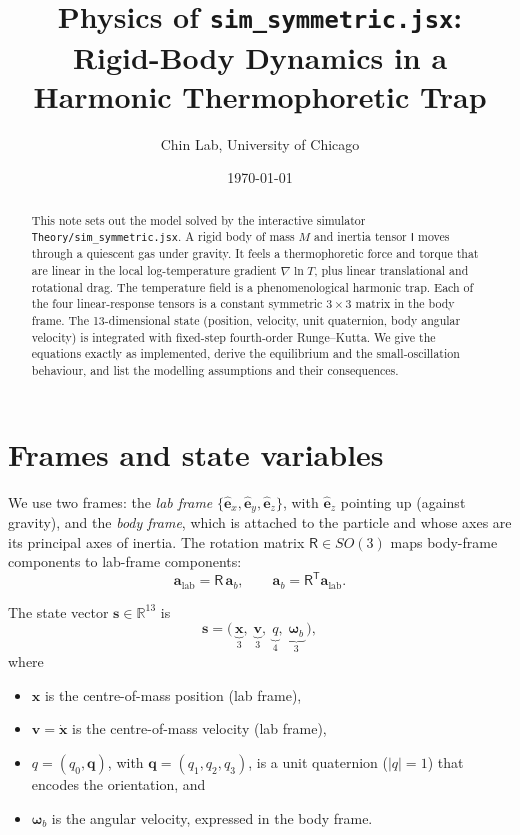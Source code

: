 \documentclass[11pt]{article}
\title{Physics of \texttt{sim\_symmetric.jsx}:\\
Rigid-Body Dynamics in a Harmonic Thermophoretic Trap}
\author{Chin Lab, University of Chicago}
\date{\today}
\newcommand{\vect}[1]{\bm{#1}}
\newcommand{\tens}[1]{\mathsf{#1}}
\newcommand{\ez}{\hat{\vect{e}}_z}
\newcommand{\Rm}{\tens{R}}
\newcommand{\T}{^{\mathsf{T}}}
\theoremstyle{remark}
\begin{document}
\maketitle

\begin{abstract}
This note sets out the model solved by the interactive simulator
\texttt{Theory/sim\_symmetric.jsx}. A rigid body of mass $M$ and inertia
tensor $\tens{I}$ moves through a quiescent gas under gravity. It feels a
thermophoretic force and torque that are linear in the local
log-temperature gradient $\nabla\ln T$, plus linear translational and
rotational drag. The temperature field is a phenomenological harmonic
trap. Each of the four linear-response tensors is a constant symmetric
$3\times3$ matrix in the body frame. The 13-dimensional state (position,
velocity, unit quaternion, body angular velocity) is integrated with
fixed-step fourth-order Runge--Kutta. We give the equations exactly as
implemented, derive the equilibrium and the small-oscillation behaviour,
and list the modelling assumptions and their consequences.
\end{abstract}

\section{Frames and state variables}

We use two frames: the \emph{lab frame}
$\{\hat{\vect{e}}_x,\hat{\vect{e}}_y,\hat{\vect{e}}_z\}$, with $\ez$
pointing up (against gravity), and the \emph{body frame}, which is attached
to the particle and whose axes are its principal axes of inertia. The
rotation matrix $\Rm\in SO(3)$ maps body-frame components to lab-frame
components:
\begin{equation}
  \vect{a}_{\text{lab}} = \Rm\,\vect{a}_b, \qquad
  \vect{a}_b = \Rm\T \vect{a}_{\text{lab}} .
\end{equation}

The state vector $\vect{s}\in\mathbb{R}^{13}$ is
\begin{equation}
  \vect{s} = \bigl(\,\underbrace{\vect{x}}_{3},\;
                  \underbrace{\vect{v}}_{3},\;
                  \underbrace{q}_{4},\;
                  \underbrace{\vect{\omega}_b}_{3}\,\bigr),
\end{equation}
where
\begin{itemize}
  \item $\vect{x}$ is the centre-of-mass position (lab frame),
  \item $\vect{v}=\dot{\vect{x}}$ is the centre-of-mass velocity (lab frame),
  \item $q=(q_0,\vect{q})$, with $\vect{q}=(q_1,q_2,q_3)$, is a unit
        quaternion ($|q|=1$) that encodes the orientation, and
  \item $\vect{\omega}_b$ is the angular velocity, expressed in the body frame.
\end{itemize}
\end{document}
